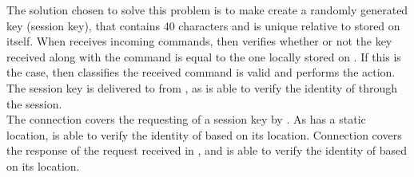 The solution chosen to solve this problem is to make  create a randomly generated key (session key), that contains 40 characters and is unique relative to  stored on  itself.
When  receives incoming commands, then  verifies whether or not the key received along with the command is equal to the one locally stored on .
If this is the case, then  classifies the received command is valid and performs the action.
The session key is delivered to  from , as  is able to verify the identity of  through the session. \\

The connection  covers the requesting of a session key by .
As  has a static location,  is able to verify the identity of  based on its location.
Connection  covers the response of the request received in , and  is able to verify the identity of  based on its location. \\




